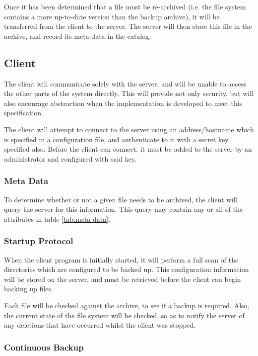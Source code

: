 Once it has been determined that a file must be re-archived (i.e. the file
system contains a more up-to-date version than the backup archive), it will be
transferred from the client to the server. The server will then store this file
in the archive, and record its meta-data in the catalog.

\subsection{Client}

The client will communicate solely with the server, and will be unable to
access the other parts of the system directly. This will provide not only
security, but will also encourage abstraction when the implementation is
developed to meet this specification.

The client will attempt to connect to the server using an address/hostname
which is specified in a configuration file, and authenticate to it with
a secret key specified also. Before the client can connect, it must be added to
the server by an administrator and configured with said key.

\subsubsection{Meta Data}

To determine whether or not a given file needs to be archived, the client will
query the server for this information. This query may contain any or all of the
attributes in table \ref{tab:meta-data}.

\subsubsection{Startup Protocol}

When the client program is initially started, it will perform a full scan of
the directories which are configured to be backed up. This configuration
information will be stored on the server, and must be retrieved before the
client can begin backing up files.

Each file will be checked against the archive, to see if a backup is required.
Also, the current state of the file system will be checked, so as to notify the
server of any deletions that have occurred whilst the client was stopped.

\subsubsection{Continuous Backup}

